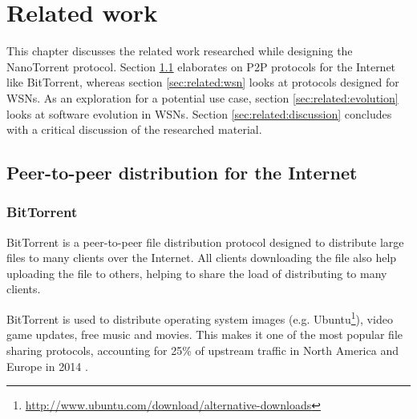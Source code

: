 \chapter{Related work}
\label{cha:related-work}
This chapter discusses the related work researched while designing the NanoTorrent protocol. Section \ref{sec:related:internet} elaborates on \acrlong{P2P} protocols for the Internet like BitTorrent, whereas section \ref{sec:related:wsn} looks at protocols designed for \glspl{WSN}. As an exploration for a potential use case, section \ref{sec:related:evolution} looks at software evolution in \glspl{WSN}. Section \ref{sec:related:discussion} concludes with a critical discussion of the researched material.

\section{Peer-to-peer distribution for the Internet}
\label{sec:related:internet}

\subsection{BitTorrent}
\label{sec:related:bittorrent}
BitTorrent \cite{bep3} is a peer-to-peer file distribution protocol designed to distribute large files to many clients over the Internet. All clients downloading the file also help uploading the file to others, helping to share the load of distributing to many clients.

BitTorrent is used to distribute operating system images (e.g. Ubuntu\footnote{\url{http://www.ubuntu.com/download/alternative-downloads}}), video game updates, free music and movies. This makes it one of the most popular file sharing protocols, accounting for 25\% of upstream traffic in North America and Europe in 2014 \cite{sandvine}.

